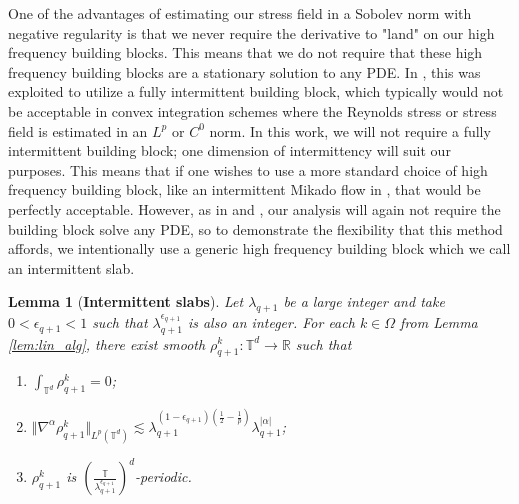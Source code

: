 \documentclass[12pt,reqno,letterpaper]{amsart}
\numberwithin{equation}{section}
\newcommand{\1}{{\bf 1}}
\newcommand{\2}{{\bf 2}}
\newcommand{\R}{\mathbb R}
\newcommand{\T}{\mathbb T}
\newtheorem{lemma}[theorem]{Lemma}
\theoremstyle{remark}
\theoremstyle{remark}
\begin{document}
One of the advantages of estimating our stress field in a Sobolev norm with negative regularity is that we never require the derivative to "land" on our high frequency building blocks. This means that we do not require that these high frequency building blocks are a stationary solution to any PDE. In \cite{GR}, this was exploited to utilize a fully intermittent building block, which typically would not be acceptable in convex integration schemes where the Reynolds stress or stress field is estimated in an $L^p$ or $C^0$ norm. In this work, we will not require a fully intermittent building block; one dimension of intermittency will suit our purposes. This means that if one wishes to use a more standard choice of high frequency building block, like an intermittent Mikado flow in \cite{ABGN}, that would be perfectly acceptable. However, as in \cite{ABGN} and \cite{GR}, our analysis will again not require the building block solve any PDE, so to demonstrate the flexibility that this method affords, we intentionally use a generic high frequency building block which we call an intermittent slab.







\begin{lemma}[\textbf{Intermittent slabs}]\label{lem:boldW}
    Let $\lambda_{q+1}$ be a large integer and take $0 < \epsilon_{q+1} < 1$ such that $\lambda_{q+1}^{\epsilon_{q+1}}$ is also an integer. For each $k \in \Omega$ from Lemma \ref{lem:lin_alg}, there exist smooth $\rho^k_{q+1}:\T^d \to \R$ such that
    \begin{enumerate}
        \item\label{w:2} $\int_{\T^d} \rho_{q+1}^k = 0$;
        \item\label{w:3} $\Vert \nabla^\alpha \rho_{q+1}^k \Vert_{L^p(\T^d)} \lesssim \lambda_{q+1}^{(1-\epsilon_{q+1})\left(\frac{1}{2}-\frac{1}{p}\right)} \lambda_{q+1}^{|\alpha|}$;
        \item\label{w:4} $\rho^k_{q+1}$ is $\left(\frac{\T}{\lambda_{q+1}^{\epsilon_{q+1}}}\right)^d$-periodic.
    \end{enumerate}
\end{lemma}
\end{document}
